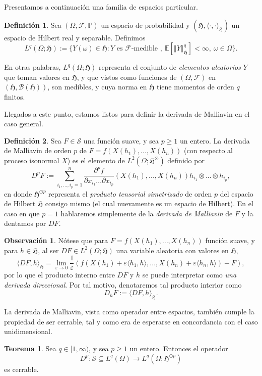 \documentclass[letterpaper,twoside,12pt]{book}
\newcommand{\F}{\mathcal{F}}
\newcommand{\B}{\mathcal{B}}
\renewcommand{\S}{\mathcal{S}}
\newcommand{\E}{\mathbb{E}}
\renewcommand{\P}{\mathbb{P}}
\newcommand{\1}{\mathds{1}}
\renewcommand{\to}{\rightarrow}
\newcommand{\norm}[1]{\left\Vert #1 \right\Vert}
\theoremstyle{definition}
\newtheorem{dfn}{Definición}
\theoremstyle{definition}
\newtheorem{teo}{Teorema}
\theoremstyle{remark}
\theoremstyle{definition}
\theoremstyle{definition}
\theoremstyle{definition}
\newtheorem{obs}{Observación}
\theoremstyle{definition}
\theoremstyle{definition}
\begin{document}
Presentamos a continuación una familia de espacios particular.

\begin{dfn} 
 Sea $(\Omega, \F, \P)$ un espacio de probabilidad y $(\mathfrak{H},\langle \cdot,\cdot\rangle_{\mathfrak{H}})$ un espacio de Hilbert real y separable. Definimos 
 \[
 L^q(\Omega;\mathfrak{H}):=\{Y(\omega)\in \mathfrak{H}:Y \text{ es }\F \text{-medible },\ \E\left[\norm{Y}_{\mathfrak{H}}^q\right]<\infty, \ \omega \in \Omega\}.
 \]
 \end{dfn}
 En otras palabras, $L^q(\Omega;\mathfrak{H})$ representa el conjunto de \textit{elementos aleatorios} $Y$ que toman valores en $\mathfrak{H}$, y que vistos como funciones de $(\Omega,\F)$ en $(\mathfrak{H},\B(\mathfrak{H}))$, son medibles, y cuya norma en $\mathfrak{H}$ tiene momentos de orden $q$ finitos. 

Llegados a este punto, estamos listos para definir la derivada de Malliavin en el caso general.
\begin{dfn} 
 Sea $F\in \S$ una función suave, y sea $p\geq1$ un entero. La derivada de Malliavin de orden $p$ de $F=f(X(h_1),...,X(h_n))$ (con respecto al proceso isonormal $X$) es el elemento de $L^2(\Omega;\mathfrak{H}^{\odot})$ definido por 
 \[
 D^pF:=\sum_{i_1,...,i_p=1}^{n}\frac{\partial^pf}{\partial x_{i_1}...\partial x_{i_p}}(X(h_1),...,X(h_n))h_{i_1}\otimes...\otimes h_{i_p},
 \] 
 en donde $\mathfrak{H}^{\odot p}$ representa el \textit{producto tensorial simetrizado} de orden $p$ del espacio de Hilbert $\mathfrak{H}$ consigo mismo (el cual nuevamente es un espacio de Hilbert). En el caso en que $p=1$ hablaremos simplemente de la \textit{derivada de Malliavin} de $F$ y la dentamos por $DF$.
 \end{dfn}
 \begin{obs}
   Nótese que para $F = f(X(h_1),...,X(h_n))$ función suave, y para $h\in \mathfrak{H}$, al ser $DF\in L^2(\Omega;\mathfrak{H})$ una variable aleatoria con valores en $\mathfrak{H}$, 
   \[
   \langle DF,h\rangle_{\mathfrak{H}}=\lim_{\varepsilon\to 0} \frac{1}{\varepsilon}\left(f(X(h_1)+\varepsilon \langle h_1,h\rangle,...,X(h_n)+\varepsilon \langle h_n,h\rangle)-F\right),
   \]
   por lo que el producto interno entre $DF$ y $h$ se puede interpretar como \textit{una derivada direccional}. Por tal motivo, denotaremos tal producto interior como  
   \[
   D_hF:=\langle DF,h\rangle_{\mathfrak{H}}.
   \]
 \end{obs}
 La derivada de Malliavin, vista como operador entre espacios, también cumple la propiedad de ser cerrable, tal y como era de esperarse en concordancia con el caso unidimensional.
 \begin{teo} 
  Sea $q\in [1,\infty)$, y sea $p\geq 1$ un entero. Entonces el operador 
  \[
  D^{p}:\S\subseteq L^q(\Omega)\to L^q(\Omega;\mathfrak{H}^{\odot p})
  \]
  es cerrable.
  \end{teo}
\end{document}
